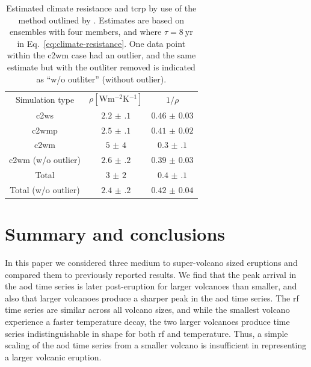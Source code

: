 \documentclass{ametsocV6.1}
\begin{document}
\begin{table}
  \centering

  \caption{Estimated climate resistance and \gls{tcrp} by use of the method outlined by
    \citet{merlis2014}. Estimates are based on ensembles with four members, and where \(\tau
    =\SI{8}{\mathrm{yr}}\) in Eq.~\ref{eq:climate-resistance}. One data point within the
    \gls{c2wm} case had an outlier, and the same estimate but with the outliter removed is
    indicated as ``w/o outliter'' (without outlier).}\label{tab:trcp}%
  \begin{tabular}{ccc}
    Simulation type          & \(\rho [\si{\watt\metre^{-2}\kelvin^{-1}}]\) & \(1/\rho\)        \\
    \gls{c2ws}               & \(\num{2.2(1)}\)                             & \(\num{0.46(3)}\) \\
    \gls{c2wmp}              & \(\num{2.5(1)}\)                             & \(\num{0.41(2)}\) \\
    \gls{c2wm}               & \(\num{5(4)}\)                               & \(\num{0.3(1)}\)  \\
    \gls{c2wm} (w/o outlier) & \(\num{2.6(2)}\)                             & \(\num{0.39(3)}\) \\
    Total                    & \(\num{3(2)}\)                               & \(\num{0.4(1)}\)  \\
    Total (w/o outlier)      & \(\num{2.4(2)}\)                             & \(\num{0.42(4)}\) \\
  \end{tabular}
\end{table}


\section{Summary and conclusions}\label{sec:conclusions}

In this paper we considered three medium to super-volcano sized eruptions and compared
them to previously reported results. We find that the peak arrival in the \gls{aod} time
series is later post-eruption for larger volcanoes than smaller, and also that larger
volcanoes produce a sharper peak in the \gls{aod} time series. The \gls{rf} time series
are similar across all volcano sizes, and while the smallest volcano experience a faster
temperature decay, the two larger volcanoes produce time series indistinguishable in
shape for both \gls{rf} and temperature. Thus, a simple scaling of the \gls{aod} time
series from a smaller volcano is insufficient in representing a larger volcanic
eruption.
\end{document}
